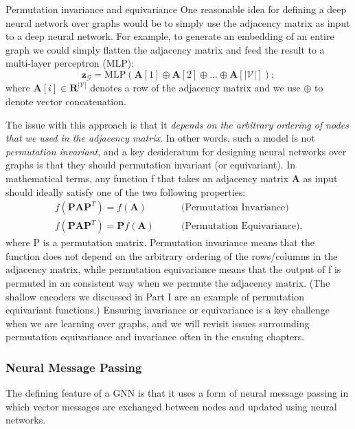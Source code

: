 \documentclass[10pt, onecolumn]{article}
\begin{document}
Permutation invariance and equivariance One reasonable idea for
defining a deep neural network over graphs would be to simply use the
adjacency matrix as input to a deep neural network. For example, to generate an embedding of an entire graph we could simply flatten the adjacency
matrix and feed the result to a multi-layer perceptron (MLP):
\begin{equation}
    \mathbf z_\mathcal G = \text{MLP}(\mathbf A[1] \oplus \mathbf A[2] \oplus \ldots \oplus \mathbf A[|\mathcal V|]);
\end{equation}
where $\mathbf A[i] \in \mathbf R^{|\mathcal V|}$ denotes a row of the adjacency matrix and we use $\oplus$ to denote vector concatenation.

The issue with this approach is that it \textit{depends on the arbitrary ordering of nodes that we used in the adjacency matrix}. In other words, such a model is not \textit{permutation invariant}, and a key desideratum for designing neural networks over graphs is that they should permutation invariant (or equivariant). In mathematical terms, any function f that takes an adjacency matrix $\mathbf A$ as input should ideally satisfy one of the two following properties:
\begin{align}
    f(\mathbf{PAP}^T) = f(\mathbf A) \qquad &\text{(Permutation Invariance)} \\
    f(\mathbf{PAP}^T) = \mathbf P f(\mathbf A) \qquad &\text{(Permutation Equivariance)},
\end{align}
where P is a permutation matrix. Permutation invariance means that the
function does not depend on the arbitrary ordering of the rows/columns in
the adjacency matrix, while permutation equivariance means that the output of f is permuted in an consistent way when we permute the adjacency
matrix. (The shallow encoders we discussed in Part I are an example of
permutation equivariant functions.) Ensuring invariance or equivariance is
a key challenge when we are learning over graphs, and we will revisit issues
surrounding permutation equivariance and invariance often in the ensuing
chapters.

\subsubsection{Neural Message Passing}

The defining feature of a GNN is that it uses a form of neural message passing in which vector messages are exchanged between nodes and updated using neural networks.
\end{document}
